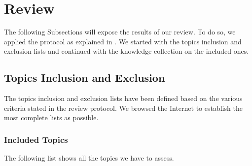 \section{Review}
\label{sec:state_review}

The following Subsections will expose the results of our review. To do so, we applied the protocol as explained in . We started with the topics inclusion and exclusion lists and continued with the knowledge collection on the included ones.

\subsection{Topics Inclusion and Exclusion}
\label{subsec:state_review_topics}

The topics inclusion and exclusion lists have been defined based on the various criteria stated in the review protocol. We browsed the Internet to establish the most complete lists as possible.

\newpage

\subsubsection{Included Topics}
\label{subsubsec:state_review_topics_included}

The following list shows all the topics we have to assess.

